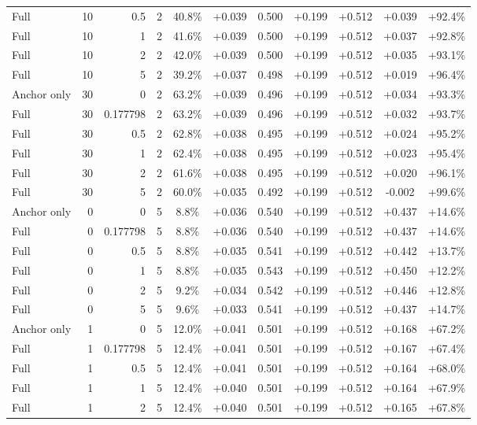 \begin{table}[htbp]
\begin{tabular}{lrrrccccccc}
Full & 10 & 0.5 & 2 & 40.8\% & +0.039 & 0.500 & +0.199 & +0.512 & +0.039 & +92.4\% \\
Full & 10 & 1 & 2 & 41.6\% & +0.039 & 0.500 & +0.199 & +0.512 & +0.037 & +92.8\% \\
Full & 10 & 2 & 2 & 42.0\% & +0.039 & 0.500 & +0.199 & +0.512 & +0.035 & +93.1\% \\
Full & 10 & 5 & 2 & 39.2\% & +0.037 & 0.498 & +0.199 & +0.512 & +0.019 & +96.4\% \\
Anchor only & 30 & 0 & 2 & 63.2\% & +0.039 & 0.496 & +0.199 & +0.512 & +0.034 & +93.3\% \\
Full & 30 & 0.177798 & 2 & 63.2\% & +0.039 & 0.496 & +0.199 & +0.512 & +0.032 & +93.7\% \\
Full & 30 & 0.5 & 2 & 62.8\% & +0.038 & 0.495 & +0.199 & +0.512 & +0.024 & +95.2\% \\
Full & 30 & 1 & 2 & 62.4\% & +0.038 & 0.495 & +0.199 & +0.512 & +0.023 & +95.4\% \\
Full & 30 & 2 & 2 & 61.6\% & +0.038 & 0.495 & +0.199 & +0.512 & +0.020 & +96.1\% \\
Full & 30 & 5 & 2 & 60.0\% & +0.035 & 0.492 & +0.199 & +0.512 & -0.002 & +99.6\% \\
Anchor only & 0 & 0 & 5 & 8.8\% & +0.036 & 0.540 & +0.199 & +0.512 & +0.437 & +14.6\% \\
Full & 0 & 0.177798 & 5 & 8.8\% & +0.036 & 0.540 & +0.199 & +0.512 & +0.437 & +14.6\% \\
Full & 0 & 0.5 & 5 & 8.8\% & +0.035 & 0.541 & +0.199 & +0.512 & +0.442 & +13.7\% \\
Full & 0 & 1 & 5 & 8.8\% & +0.035 & 0.543 & +0.199 & +0.512 & +0.450 & +12.2\% \\
Full & 0 & 2 & 5 & 9.2\% & +0.034 & 0.542 & +0.199 & +0.512 & +0.446 & +12.8\% \\
Full & 0 & 5 & 5 & 9.6\% & +0.033 & 0.541 & +0.199 & +0.512 & +0.437 & +14.7\% \\
Anchor only & 1 & 0 & 5 & 12.0\% & +0.041 & 0.501 & +0.199 & +0.512 & +0.168 & +67.2\% \\
Full & 1 & 0.177798 & 5 & 12.4\% & +0.041 & 0.501 & +0.199 & +0.512 & +0.167 & +67.4\% \\
Full & 1 & 0.5 & 5 & 12.4\% & +0.041 & 0.501 & +0.199 & +0.512 & +0.164 & +68.0\% \\
Full & 1 & 1 & 5 & 12.4\% & +0.040 & 0.501 & +0.199 & +0.512 & +0.164 & +67.9\% \\
Full & 1 & 2 & 5 & 12.4\% & +0.040 & 0.501 & +0.199 & +0.512 & +0.165 & +67.8\% \\

\end{tabular}
\end{table}
